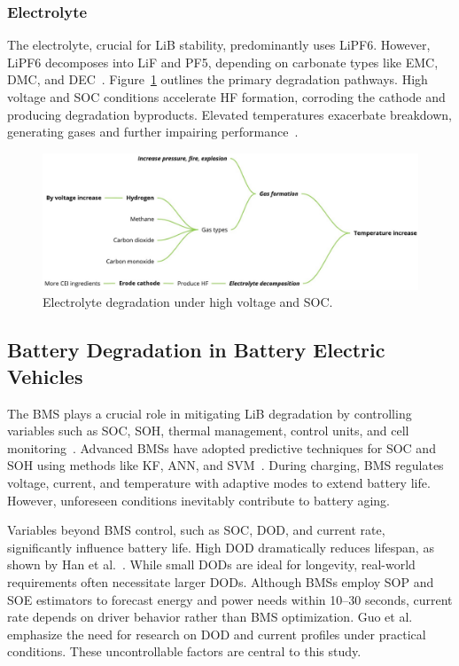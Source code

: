\subsubsection{Electrolyte}

The electrolyte, crucial for \gls{LiB} stability, predominantly uses \gls{LiPF6}. 
However, \gls{LiPF6} decomposes into \gls{LiF} and \gls{PF5}, depending on carbonate types like \gls{EMC}, \gls{DMC}, and \gls{DEC}~\cite{YANG2006573}. 
Figure~\ref{fig:electro_reactions} outlines the primary degradation pathways. 
High voltage and \gls{SOC} conditions accelerate \gls{HF} formation, corroding the cathode and producing degradation byproducts. 
Elevated temperatures exacerbate breakdown, generating gases and further impairing performance~\cite{Lu2013}.

\begin{figure}[hbt]
    \centering
    \includegraphics[width=\textwidth]{Chapter2/figures/Electro_reactions2.jpg}
    \caption{Electrolyte degradation under high voltage and \gls{SOC}.}
    \label{fig:electro_reactions}
\end{figure}

\subsection{Battery Degradation in Battery Electric Vehicles}

The \gls{BMS} plays a crucial role in mitigating \gls{LiB} degradation by controlling variables such as \gls{SOC}, \gls{SOH}, thermal management, control units, and cell monitoring~\cite{Ramkumar2022}. 
Advanced \glspl{BMS} have adopted predictive techniques for \gls{SOC} and \gls{SOH} using methods like \gls{KF}, \gls{ANN}, and \gls{SVM}~\cite{Liu2022}. 
During charging, \gls{BMS} regulates voltage, current, and temperature with adaptive modes to extend battery life. 
However, unforeseen conditions inevitably contribute to battery aging.

Variables beyond \gls{BMS} control, such as \gls{SOC}, \gls{DOD}, and current rate, significantly influence battery life. 
High \gls{DOD} dramatically reduces lifespan, as shown by Han et al.~\cite{han2019review}. 
While small \glspl{DOD} are ideal for longevity, real-world requirements often necessitate larger \glspl{DOD}. 
Although \glspl{BMS} employ \gls{SOP} and \gls{SOE} estimators to forecast energy and power needs within 10–30 seconds, current rate depends on driver behavior rather than \gls{BMS} optimization. 
Guo et al.~\cite{guo2021lithium} emphasize the need for research on \gls{DOD} and current profiles under practical conditions. These uncontrollable factors are central to this study.

